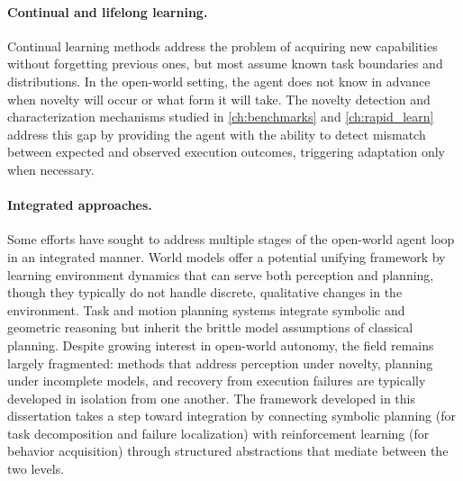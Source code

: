 \paragraph{Continual and lifelong learning.}
Continual learning methods \citep{kirkpatrick2017overcoming, rusu2016progressive} address the problem of acquiring new capabilities without forgetting previous ones, but most assume known task boundaries and distributions. In the open-world setting, the agent does not know in advance when novelty will occur or what form it will take. The novelty detection and characterization mechanisms studied in \cref{ch:benchmarks} and \cref{ch:rapid_learn} address this gap by providing the agent with the ability to detect mismatch between expected and observed execution outcomes, triggering adaptation only when necessary.

\paragraph{Integrated approaches.}
Some efforts have sought to address multiple stages of the open-world agent loop in an integrated manner. World models \citep{ha2018world, hafner2023mastering} offer a potential unifying framework by learning environment dynamics that can serve both perception and planning, though they typically do not handle discrete, qualitative changes in the environment. Task and motion planning systems \citep{garrett2021integrated, kaelbling2011hierarchical} integrate symbolic and geometric reasoning but inherit the brittle model assumptions of classical planning. Despite growing interest in open-world autonomy, the field remains largely fragmented: methods that address perception under novelty, planning under incomplete models, and recovery from execution failures are typically developed in isolation from one another. The framework developed in this dissertation takes a step toward integration by connecting symbolic planning (for task decomposition and failure localization) with reinforcement learning (for behavior acquisition) through structured abstractions that mediate between the two levels.